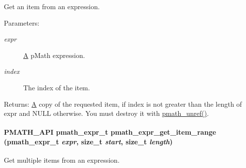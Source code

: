 Get an item from an expression. 

\begin{Desc}
\item[Parameters:]
\begin{description}
\item[{\em expr}]\hyperlink{class_a}{A} pMath expression. \item[{\em index}]The index of the item. \end{description}
\end{Desc}
\begin{Desc}
\item[Returns:]\hyperlink{class_a}{A} copy of the requested item, if index is not greater than the length of expr and NULL otherwise. You must destroy it with \hyperlink{classpmath__t_54e905402c38940687033b87eb8c6c9f}{pmath\_\-unref()}. \end{Desc}
\hypertarget{group__expressions_ga3ba4e55b5e454f569c7e131653d5b14}{
\paragraph[{pmath\_\-expr\_\-get\_\-item\_\-range}]{\setlength{\rightskip}{0pt plus 5cm}PMATH\_\-API {\bf pmath\_\-expr\_\-t} pmath\_\-expr\_\-get\_\-item\_\-range ({\bf pmath\_\-expr\_\-t} {\em expr}, \/  size\_\-t {\em start}, \/  size\_\-t {\em length})}\hfill}
\label{group__expressions_ga3ba4e55b5e454f569c7e131653d5b14}


Get multiple items from an expression. 

